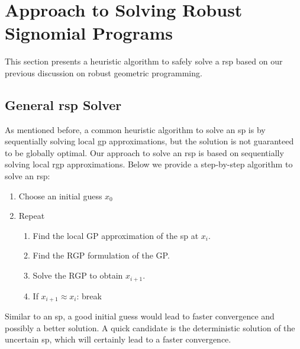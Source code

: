 \section{Approach to Solving Robust Signomial Programs}

This section presents a heuristic algorithm to safely solve a \gls{rsp}
based on our previous discussion on robust geometric programming.

\subsection{General \gls{rsp} Solver}
As mentioned before, a common heuristic algorithm to solve an \gls{sp} is
by sequentially solving local \gls{gp} approximations, but the solution is not guaranteed
to be globally optimal. Our approach to solve an \gls{rsp} is based on sequentially solving
local \gls{rgp} approximations. Below we provide a step-by-step algorithm to solve an \gls{rsp}:

\begin{enumerate}
    \item Choose an initial guess $x_0$
    \item Repeat
    \begin{enumerate}
        \item Find the local GP approximation of the \gls{sp} at $x_i$.
        \item Find the RGP formulation of the GP.
        \item Solve the RGP to obtain $x_{i+1}$.
        \item If $x_{i+1} \approx x_{i}$: break
    \end{enumerate}
\end{enumerate}

Similar to an \gls{sp}, a good initial guess would lead to faster convergence and possibly a better solution.
A quick candidate is the deterministic solution of the uncertain \gls{sp}, which will certainly lead to a faster convergence.

